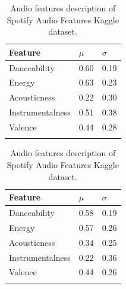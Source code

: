 \documentclass[sn-mathphys]{sn-jnl}%
\theoremstyle{thmstyleone}%
\theoremstyle{thmstyletwo}%
\theoremstyle{thmstylethree}%
\begin{document}
\begin{table}[!ht]
      \begin{minipage}{.5\linewidth}
      \caption{Audio features description of the Last.fm Single-user dataset.}\label{table:audio-features-stats}
            \centering
                  \begin{tabular}{@{}lll@{}}
                  \toprule
                  Feature           & $\mu$ & $\sigma$ \\
                  \midrule
                  Danceability      & 0.60  & 0.19  \\
                  Energy            & 0.63  & 0.23  \\
                  Acousticness      & 0.22  & 0.30  \\
                  Instrumentalness  & 0.51  & 0.38  \\
                  Valence           & 0.44  & 0.28  \\
                  \botrule
                  \end{tabular}
      \end{minipage}
      \begin{minipage}{.5\linewidth}
      \caption{Audio features description of Spotify Audio Features Kaggle dataset.}\label{table:audio-features-stats-kaggle}%
            \centering
                  \begin{tabular}{@{}lll@{}}
                  \toprule
                  Feature           & $\mu$ & $\sigma$ \\
                  \midrule
                  Danceability      & 0.58   & 0.19  \\
                  Energy            & 0.57  & 0.26  \\
                  Acousticness      & 0.34  & 0.25  \\
                  Instrumentalness  & 0.22  & 0.36  \\
                  Valence           & 0.44  & 0.26  \\
                  \botrule
                  \end{tabular}
      \end{minipage}

\end{table}

\end{document}
